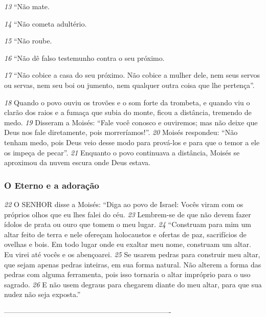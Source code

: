 \smallskip
\textit{\tiny 13}
“Não mate.

\smallskip
\textit{\tiny 14}
“Não cometa adultério.

\smallskip
\textit{\tiny 15}
“Não roube.

\smallskip
\textit{\tiny 16}
“Não dê falso testemunho contra o seu próximo.

\smallskip
\textit{\tiny 17}
“Não cobice a casa do seu próximo. Não cobice a mulher dele, nem seus servos ou servas, nem seu boi ou jumento, nem qualquer outra coisa que lhe pertença”.
  
\medskip
\textit{\tiny 18}
Quando o povo ouviu os trovões e o som forte da trombeta, e quando viu o
clarão dos raios e a fumaça que subia do monte, ficou a distância, tremendo de medo.
\textit{\tiny 19}
Disseram a Moisés: “Fale você conosco e ouviremos; mas não deixe que Deus
nos fale diretamente, pois morreríamos!”.
\textit{\tiny 20}
Moisés respondeu: “Não tenham medo, pois Deus veio desse modo para
prová-los e para que o temor a ele os impeça de pecar”.
\textit{\tiny 21}
Enquanto o povo continuava a distância, Moisés se aproximou da nuvem
escura onde Deus estava.

\bigskip
\subsubsection*{O Eterno e a adoração}
\textit{\tiny 22}
O SENHOR disse a Moisés: “Diga ao povo de Israel: Vocês viram com os próprios olhos que eu lhes falei do céu. 
\textit{\tiny 23}
Lembrem-se de que não devem fazer ídolos de
prata ou ouro que tomem o meu lugar.
\textit{\tiny 24}
“Construam para mim um altar feito de terra e nele ofereçam holocaustos e
ofertas de paz, sacrifícios de ovelhas e bois. Em todo lugar onde eu exaltar meu nome, construam um altar. Eu virei até vocês e os abençoarei. 
\textit{\tiny 25}
Se usarem pedras
para construir meu altar, que sejam apenas pedras inteiras, em sua forma natural.
Não alterem a forma das pedras com alguma ferramenta, pois isso tornaria o altar impróprio para o uso sagrado. 
\textit{\tiny 26}
E não usem degraus para chegarem diante do
meu altar, para que sua nudez não seja exposta.”

----------------------------------------------------------------------
